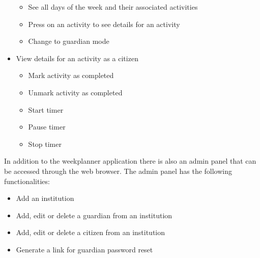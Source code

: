 \begin{itemize}
    \begin{itemize}
        \item See all days of the week and their associated activities
        \item Press on an activity to see details for an activity
        \item Change to guardian mode
    \end{itemize}
    \item View details for an activity as a citizen
    \begin{itemize}
        \item Mark activity as completed
        \item Unmark activity as completed
        \item Start timer
        \item Pause timer
        \item Stop timer
    \end{itemize}
\end{itemize}
In addition to the weekplanner application there is also an admin panel that can be accessed through the web browser.
The admin panel has the following functionalities:
\begin{itemize}
    \item Add an institution
    \item Add, edit or delete a guardian from an institution
    \item Add, edit or delete a citizen from an institution
    \item Generate a link for guardian password reset
\end{itemize}

